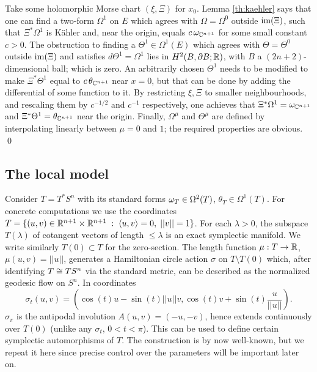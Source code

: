 \documentclass[10pt,letterpaper]{article}
\begin{document}
 Take some holomorphic Morse
chart $(\xi,\Xi)$ for $x_0$. Lemma \ref{th:kaehler} says that one can find a
two-form $\Omega^1$ on $E$ which agrees with $\Omega = \Omega^0$ outside
$\mathrm{im}(\Xi)$, such that $\Xi^*\Omega^1$ is K{\"a}hler and, near the origin,
equals $c\, \omega_{\mathbb{C}^{n+1}}$ for some small constant $c>0$. The obstruction to
finding a $\Theta^1 \in \Omega^1(E)$ which agrees with $\Theta = \Theta^0$
outside $\mathrm{im}(\Xi)$ and satisfies $d\Theta^1 = \Omega^1$ lies in $H^2(B,\partial
B;\mathbb{R})$, with $B$ a $(2n+2)$-dimensional ball; which is zero. An arbitrarily
chosen $\Theta^1$ needs to be modified to make $\Xi^*\Theta^1$ equal to
$c\,\theta_{\mathbb{C}^{n+1}}$ near $x = 0$, but that can be done by adding the
differential of some function to it. By restricting $\xi,\Xi$ to smaller
neighbourhoods, and rescaling them by $c^{-1/2}$ and $c^{-1}$ respectively, one
achieves that $\Xi^*\Omega^1 = \omega_{\mathbb{C}^{n+1}}$ and $\Xi^*\Theta^1 =
\theta_{\mathbb{C}^{n+1}}$ near the origin. Finally, $\Omega^\mu$ and $\Theta^\mu$ are
defined by interpolating linearly between $\mu = 0$ and $1$; the required
properties are obvious. \qed

%

\subsection{The local model\label{sec:model}}

Consider $T = T^*\!S^n$ with its standard forms $\omega_T \in \Omega^2(T)$,
$\theta_T \in \Omega^1(T)$. For concrete computations we use the coordinates $T
= \{ (u,v) \in \mathbb{R}^{n+1} \times \mathbb{R}^{n+1} \; : \; \langle u, v \rangle = 0, \;
||v|| = 1 \}$. For each $\lambda>0$, the subspace $T(\lambda)$ of cotangent
vectors of length $\leq \lambda$ is an exact symplectic manifold. We write
similarly $T(0) \subset T$ for the zero-section. The length function $\mu: T
\rightarrow \mathbb{R}$, $\mu(u,v) = ||u||$, generates a Hamiltonian circle action
$\sigma$ on $T \setminus T(0)$ which, after identifying $T \cong TS^n$ via the
standard metric, can be described as the normalized geodesic flow on $S^n$. In
coordinates
\[
\sigma_t(u,v) = (\cos(t)u - \sin(t) ||u|| v,\cos(t)v + \sin(t)\frac{u}{||u||}).
\]
$\sigma_\pi$ is the antipodal involution $A(u,v) = (-u,-v)$, hence extends
continuously over $T(0)$ (unlike any $\sigma_t$, $0 < t < \pi$). This can be
used to define certain symplectic automorphisms of $T$. The construction is by
now well-known, but we repeat it here since precise control over the parameters
will be important later on.
\end{document}

